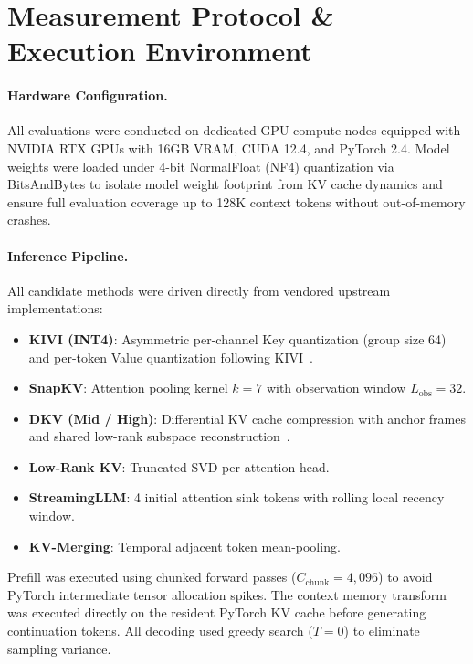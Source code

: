 \documentclass[10pt]{article}
\theoremstyle{definition}
\begin{document}
\clearpage
\section{Measurement Protocol \& Execution Environment}
\label{sec:app_protocol}

\paragraph{Hardware Configuration.} All evaluations were conducted on dedicated GPU compute nodes equipped with NVIDIA RTX GPUs with 16GB VRAM, CUDA 12.4, and PyTorch 2.4. Model weights were loaded under 4-bit NormalFloat (NF4) quantization via BitsAndBytes to isolate model weight footprint from KV cache dynamics and ensure full evaluation coverage up to 128K context tokens without out-of-memory crashes.

\paragraph{Inference Pipeline.} All candidate methods were driven directly from vendored upstream implementations:
\begin{itemize}[leftmargin=*,itemsep=1.5pt]
    \item \textbf{KIVI (INT4)}: Asymmetric per-channel Key quantization (group size 64) and per-token Value quantization following KIVI~\citep{liu2024kivi}.
    \item \textbf{SnapKV}: Attention pooling kernel $k = 7$ with observation window $L_{\text{obs}} = 32$.
    \item \textbf{DKV (Mid / High)}: Differential KV cache compression with anchor frames and shared low-rank subspace reconstruction~\citep{chimurkar2026dkv}.
    \item \textbf{Low-Rank KV}: Truncated SVD per attention head.
    \item \textbf{StreamingLLM}: 4 initial attention sink tokens with rolling local recency window.
    \item \textbf{KV-Merging}: Temporal adjacent token mean-pooling.
\end{itemize}

Prefill was executed using chunked forward passes ($C_{\text{chunk}} = 4{,}096$) to avoid PyTorch intermediate tensor allocation spikes. The context memory transform was executed directly on the resident PyTorch KV cache before generating continuation tokens. All decoding used greedy search ($T = 0$) to eliminate sampling variance.
\end{document}
